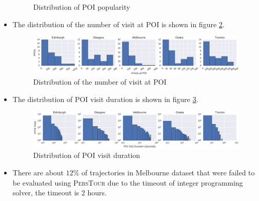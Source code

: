 \begin{itemize}
\begin{figure}
      \caption{Distribution of POI popularity}
      \label{fig:popularity}
      \end{figure}
\item The distribution of the number of visit at POI is shown in figure \ref{fig:nvisit}.
      \begin{figure}
      \includegraphics[width=\textwidth]{fig/poi_nvisit.pdf}
      \caption{Distribution of the number of visit at POI}
      \label{fig:nvisit}
      \end{figure}
\item The distribution of POI visit duration is shown in figure \ref{fig:duration}.
      \begin{figure}
      \includegraphics[width=\textwidth]{fig/visit_duration.pdf}
      \caption{Distribution of POI visit duration}
      \label{fig:duration}
      \end{figure}
\item There are about $12$\% of trajectories in Melbourne dataset that were failed to be evaluated 
      using \textsc{PersTour} due to the timeout of integer programming solver, the timeout is $2$ hours.
\end{itemize}
